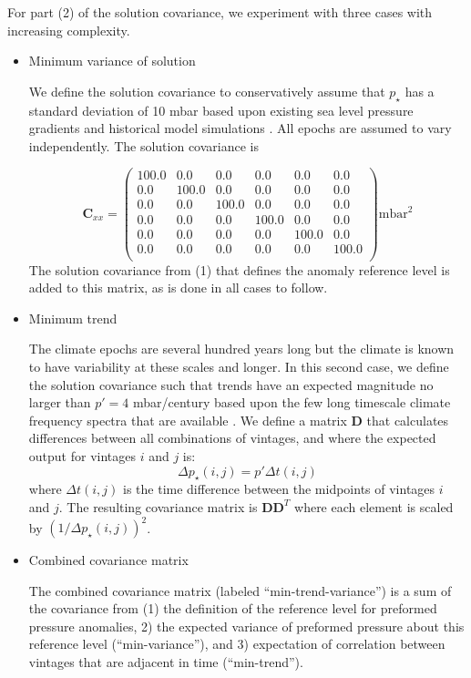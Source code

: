 \documentclass[12pt]{article}
\begin{document}
For part (2) of the solution covariance, we experiment with three cases with increasing complexity.
\begin{itemize}
\item Minimum variance of solution

  We define the solution covariance to conservatively assume that $p_{\star}$ has a standard deviation of 10 mbar based upon existing sea level pressure gradients and
  historical model simulations \cite{Hakim-Emile-Geay-2016:last}. All epochs are assumed to vary independently. The solution covariance is
  
\begin{equation}
\label{eq:6}
\mathbf{C}_{xx} = \left(
\begin{array}{cccccc}
100.0 & 0.0 & 0.0 & 0.0 & 0.0 & 0.0 \\
0.0 & 100.0 & 0.0 & 0.0 & 0.0 & 0.0 \\
0.0 & 0.0 & 100.0 & 0.0 & 0.0 & 0.0 \\
0.0 & 0.0 & 0.0 & 100.0 & 0.0 & 0.0 \\
0.0 & 0.0 & 0.0 & 0.0 & 100.0 & 0.0 \\
0.0 & 0.0 & 0.0 & 0.0 & 0.0 & 100.0 \\
\end{array}
\right) \mathrm{mbar}^{2}
\end{equation}
The solution covariance from (1) that defines the anomaly reference level is added to this matrix, as is done in all cases to follow.

\item Minimum trend

  The climate epochs are several hundred years long but the climate is
  known to have variability at these scales and longer. In this second
  case, we define the solution covariance such that trends have an
  expected magnitude no larger than $p\prime = 4$ mbar/century based
  upon the few long timescale climate frequency spectra that are
  available \cite{Huybers-Curry-2006:Links}. We define a matrix $\mathbf{D}$ that calculates differences between all combinations of vintages, and where the expected output for vintages $i$ and $j$ is:
  \begin{equation}
\label{eq:8}
{\Delta}p_{\star}(i,j) = p\prime {\Delta}t(i,j)
\end{equation}
where ${\Delta}t(i,j)$ is the time difference between the midpoints of vintages $i$ and $j$. 
The resulting covariance matrix is $\mathbf{D}\mathbf{D}^{T}$ where each element is scaled by $(1 / {\Delta}p_{\star}(i,j))^{2}$.

\item Combined covariance matrix

  The combined covariance matrix (labeled ``min-trend-variance'') is a
  sum of the covariance from (1) the definition of the reference level
  for preformed pressure anomalies, 2) the expected variance of
  preformed pressure about this reference level (``min-variance''),
  and 3) expectation of correlation between vintages that are adjacent
  in time (``min-trend'').
  
\end{itemize}
\end{document}
